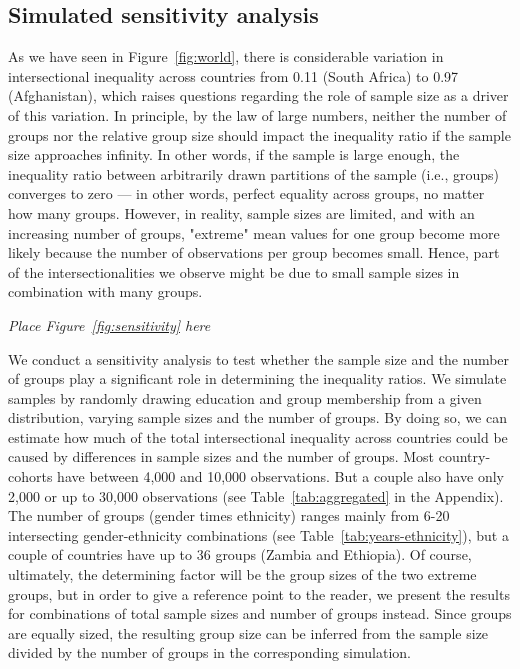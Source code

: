 \hypertarget{sensitivity}{%
\subsection{Simulated sensitivity analysis}\label{sensitivity}}

As we have seen in Figure~\ref{fig:world}, there is considerable variation in intersectional inequality across countries from 0.11 (South Africa) to 0.97 (Afghanistan), which raises questions regarding the role of sample size as a driver of this variation. In principle, by the law of large numbers, neither the number of groups nor the relative group size should impact the inequality ratio if the sample size approaches infinity. In other words, if the sample is large enough, the inequality ratio between arbitrarily drawn partitions of the sample (i.e., groups) converges to zero --- in other words, perfect equality across groups, no matter how many groups. However, in reality, sample sizes are limited, and with an increasing number of groups, "extreme" mean values for one group become more likely because the number of observations per group becomes small. Hence, part of the intersectionalities we observe might be due to small sample sizes in combination with many groups.

\begin{center}
    \textit{Place Figure~\ref{fig:sensitivity} here}
\end{center}

We conduct a sensitivity analysis to test whether the sample size and the number of groups play a significant role in determining the inequality ratios. We simulate samples by randomly drawing education and group membership from a given distribution, varying sample sizes and the number of groups. By doing so, we can estimate how much of the total intersectional inequality across countries could be caused by differences in sample sizes and the number of groups. Most country-cohorts have between 4,000 and 10,000 observations. But a couple also have only 2,000 or up to 30,000 observations (see Table~\ref{tab:aggregated} in the Appendix). The number of groups (gender times ethnicity) ranges mainly from 6-20 intersecting gender-ethnicity combinations (see Table~\ref{tab:years-ethnicity}), but a couple of countries have up to 36 groups (Zambia and Ethiopia). Of course, ultimately, the determining factor will be the group sizes of the two extreme groups, but in order to give a reference point to the reader, we present the results for combinations of total sample sizes and number of groups instead. Since groups are equally sized, the resulting group size can be inferred from the sample size divided by the number of groups in the corresponding simulation.

